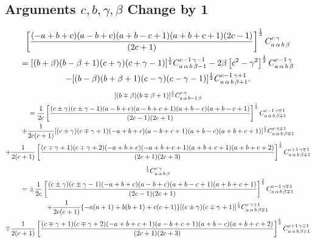 \subsection{Arguments $c, b, \gamma, \beta$ Change by 1}\label{sec:8.6.7}
\begin{multline}
{\left[\frac{(-a+b+c)(a-b+c)(a+b-c+1)(a+b+c+1)(2 c-1)}{(2 c+1)}\right]^{\frac{1}{2}} C_{a\,\alpha\,b\,\beta}^{c\,\gamma}}  \\
=[(b+\beta)(b-\beta+1)(c+\gamma)(c+\gamma-1)]^{\frac{1}{2}} C_{a\,\alpha\,b\,\beta-1}^{c-1\,\gamma-1}-2 \beta\left[c^{2}-\gamma^{2}\right]^{\frac{1}{2}} C_{a\,\alpha\,b\,\beta}^{c-1\,\gamma}  \\
-[(b-\beta)(b+\beta+1)(c-\gamma)(c-\gamma-1)]^{\frac{1}{2}} C_{a\,\alpha\,b\,\beta+1}^{c-1\,\gamma+1} . \label{eq:8:6:31}
\end{multline}
\begin{multline}
{[(b \mp \beta)(b \mp \beta+1)]^{\frac{1}{2}} C_{a\,\alpha\,b-1\,\beta}^{c\,\gamma}}  \\
=\frac{1}{2 c}\left[\frac{(c \pm \gamma)(c \pm \gamma-1)(a-b+c)(a-b+c+1)(a+b-c)(a+b-c+1)}{(2 c-1)(2 c+1)}\right]^{\frac{1}{2}} C_{a\,\alpha\,b\,\beta \mp 1}^{c-1\,\gamma \mp 1}  \\
\pm \frac{1}{2 c(c+1)}[(c \pm \gamma)(c \mp \gamma+1)(-a+b+c)(a-b+c+1)(a+b-c)(a+b+c+1)]^{\frac{1}{2}} C_{a\,\alpha\,b\,\beta \mp 1}^{c\,\gamma \mp 1}  \\
+\frac{1}{2(c+1)}\left[\frac{(c \mp \gamma+1)(c \mp \gamma+2)(-a+b+c)(-a+b+c+1)(a+b+c+1)(a+b+c+2)}{(2 c+1)(2 c+3)}\right]^{\frac{1}{2}} C_{a\,\alpha\,b\,\beta \mp 1}^{c+1\,\gamma \mp 1}  \label{eq:8:6:32}
\end{multline}
\begin{multline}
  [(b\pm\beta)(b\mp\beta+1)]^{\frac{1}{2}}\clebsch{a}{\alpha}{b}{\beta}{c}{\gamma}\\
= \pm \frac{1}{2 c}\left[\frac{(c \pm \gamma)(c \pm \gamma-1)(-a+b+c)(a-b+c)(a+b-c+1)(a+b+c+1)}{(2 c-1)(2 c+1)}\right]^{\frac{1}{2}} \clebsch{a}{\alpha}{b}{\beta \mp 1}{c-1}{\gamma \mp 1}  \\
+\frac{1}{2 c(c+1)}\{-a(a+1)+b(b+1)+c(c+1)\}[(c \pm \gamma)(c \mp \gamma+1)]^{\frac{1}{2}} \clebsch{a}{\alpha}{b}{\beta \mp 1}{c}{\gamma \mp 1}  \\
\mp \frac{1}{2(c+1)}\left[\frac{(c \mp \gamma+1)(c \mp \gamma+2)(-a+b+c+1)(a-b+c+1)(a+b-c)(a+b+c+2)}{(2 c+1)(2 c+3)}\right]^{\frac{1}{2}} \clebsch{a}{\alpha}{b}{\beta \mp 1}{c+1}{\gamma \mp 1} \label{eq:8:6:33}
\end{multline}
